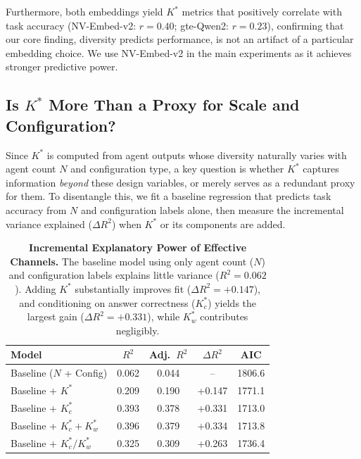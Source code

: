 \documentclass{article}
\theoremstyle{plain}
\theoremstyle{definition}
\theoremstyle{remark}
\begin{document}
Furthermore, both embeddings yield $K^*$ metrics that positively correlate with task accuracy (NV-Embed-v2: $r = 0.40$; gte-Qwen2: $r = 0.23$), confirming that our core finding, diversity predicts performance, is not an artifact of a particular embedding choice. We use NV-Embed-v2 in the main experiments as it achieves stronger predictive power.






\subsection{Is $K^*$ More Than a Proxy for Scale and Configuration?}
\label{sec:kstar_incremental}
Since $K^*$ is computed from agent outputs whose diversity naturally varies with agent count $N$ and configuration type, a key question is whether $K^*$ captures information \emph{beyond} these design variables, or merely serves as a redundant proxy for them.
To disentangle this, we fit a baseline regression that predicts task accuracy from $N$ and configuration labels alone, then measure the incremental variance explained ($\Delta R^2$) when $K^*$ or its components are added.


\begin{table}[h]
\centering
\caption{\textbf{Incremental Explanatory Power of Effective Channels.}
The baseline model using only agent count ($N$) and configuration labels explains little variance ($R^2 = 0.062$). Adding $K^*$ substantially improves fit ($\Delta R^2 = +0.147$), and conditioning on answer correctness ($K^*_c$) yields the largest gain ($\Delta R^2 = +0.331$), while $K^*_w$ contributes negligibly.}

\label{tab:exp1-incremental-explanatory}
\footnotesize
\setlength{\tabcolsep}{5pt}
\begin{tabular}{l|cccc}
\toprule
\textbf{Model} & \textbf{$R^2$} & \textbf{Adj.\ $R^2$} & \textbf{$\Delta R^2$} & \textbf{AIC} \\
\midrule
Baseline ($N$ + Config) & 0.062 & 0.044 & -- & 1806.6 \\
Baseline + $K^*$        & 0.209 & 0.190 & +0.147 & 1771.1 \\
Baseline + $K^*_c$      & 0.393 & 0.378 & +0.331 & 1713.0 \\
Baseline + $K^*_c + K^*_w$ & 0.396 & 0.379 & +0.334 & 1713.8 \\
Baseline + $K^*_c/K^*_w$   & 0.325 & 0.309 & +0.263 & 1736.4 \\
\bottomrule
\end{tabular}
\end{table}
\end{document}
